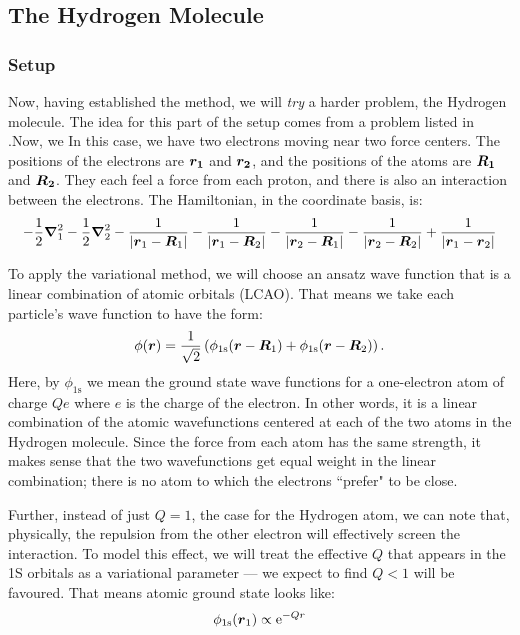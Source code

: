 \documentclass[12pt]{article}
\newcommand{\e}{\mathrm{e}}
\numberwithin{equation}{section}
\begin{document}
\subsection{The Hydrogen Molecule}
\subsubsection{Setup}
Now, having established the method, we will \textit{try} a harder problem, the Hydrogen molecule.  The idea for this part of the setup comes from a problem listed in \cite{Jensen2}.Now, we   In this case, we have two electrons moving near two force centers.  The positions of the electrons are $\vb*{r_1}$ and $\vb*{r_2}$, and the positions of the atoms are $\vb*{R_1}$ and $\vb*{R_2}$.  They each feel a force from each proton, and there is also an interaction between the electrons.  The Hamiltonian, in the coordinate basis, is:
\begin{equation}
    -\frac12 \grad_1^2 - \frac12 \grad_2^2 - \frac{1}{|\vb*r_1 - \vb*R_1|}- \frac{1}{|\vb*r_1 - \vb*R_2|}- \frac{1}{|\vb*r_2 - \vb*R_1|}- \frac{1}{|\vb*r_2 - \vb*R_2|} + \frac{1}{|\vb*r_1 - \vb*r_2|}
\end{equation}

To apply the variational method, we will choose an ansatz wave function that is a linear combination of atomic orbitals (LCAO). That means we take each particle's wave function to have the form:
\begin{equation}
    \phi(\vb*r) = \frac{1}{\sqrt{2}}\left( \phi_{\text{1s}}(\vb*r - \vb*R_1) +  \phi_{\text{1s}}(\vb*r - \vb*R_2) \right).
\end{equation}
Here, by $\phi_{\text{1s}}$ we mean the ground state wave functions for a one-electron atom of charge $Qe$ where $e$ is the charge of the electron.  In other words, it is a linear combination of the atomic wavefunctions centered at each of the two atoms in the Hydrogen molecule.  Since the force from each atom has the same strength, it makes sense that the two wavefunctions get equal weight in the linear combination; there is no atom to which the electrons ``prefer" to be close.

Further, instead of just $Q = 1$, the case for the Hydrogen atom, we can note that, physically, the repulsion from the other electron will effectively screen the interaction.  To model this effect, we will treat the effective $Q$ that appears in the 1S orbitals as a variational parameter --- we expect to find $Q < 1$ will be favoured.  That means atomic ground state looks like:
\begin{equation}
    \phi_{\text{1s}}(\vb*r_1) \propto \e ^{-Q r}
\end{equation}
\end{document}
